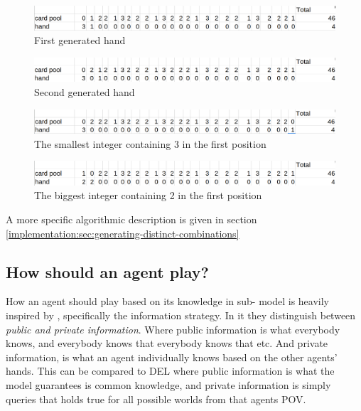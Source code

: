 \begin{figure}
	\centering
\includegraphics[width=13cm,frame]{images/biggest_integer.png}
	\caption{First generated hand}
	\label{fig:biggest-integer}
\end{figure}

\begin{figure}
	\centering
\includegraphics[width=13cm,frame]{images/next-biggest.png}
	\caption{Second generated hand}
	\label{fig:next-integer}
\end{figure}

\begin{figure}
	\centering
\includegraphics[width=13cm,frame]{images/etc_one.png}
	\caption{The smallest integer containing 3 in the first position}
	\label{fig:etc-one}
\end{figure}


\begin{figure}
	\centering
\includegraphics[width=13cm,frame]{images/decrement.png}
	\caption{The biggest integer containing 2 in the first position}
	\label{fig:decrement}
\end{figure}


A more specific algorithmic description is given in section \ref{implementation:sec:generating-distinct-combinations}

\subsection{How should an agent play?} \label{sec:how-should-an-agent-play}

How an agent should play based on its knowledge in sub-\SfiveN{} model is heavily inspired by \cite{CoxEtAl2015}, specifically the information strategy. 
In it they distinguish between \emph{public and private information}. Where public information is what everybody knows, and everybody knows that everybody knows that etc. And private information, is what an agent individually knows based on the other agents' hands. This can be compared to DEL where public information is what the model guarantees is common knowledge, and private information is simply queries that holds true for all possible worlds from that agents POV.

